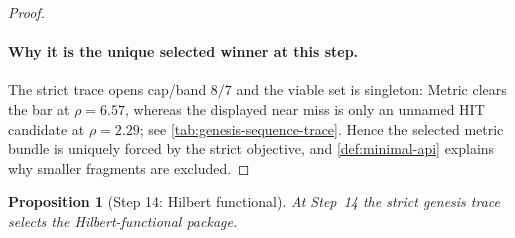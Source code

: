 \documentclass[11pt,a4paper]{article}
\theoremstyle{plain}
\newtheorem{proposition}[theorem]{Proposition}
\theoremstyle{definition}
\theoremstyle{remark}
\begin{document}
\begin{proof}
\paragraph{Why it is the unique selected winner at this step.}
The strict trace opens cap/band $8/7$ and the viable set is singleton:
Metric clears the bar at $\rho=6.57$, whereas the displayed near miss is only an
unnamed HIT candidate at $\rho=2.29$; see
\cref{tab:genesis-sequence-trace}.
Hence the selected metric bundle is uniquely forced by the strict objective, and
\cref{def:minimal-api} explains why smaller fragments are excluded.
\end{proof}

\begin{proposition}[Step 14: Hilbert functional]
\label{prop:genesis-step14}
At Step~14 the strict genesis trace selects the Hilbert-functional package.
\end{proposition}
\end{document}
